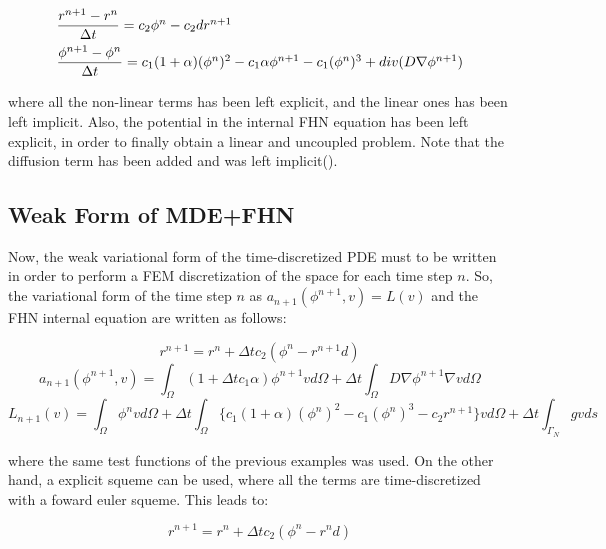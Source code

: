 \begin{equation}
\arraycolsep=1.4pt\def\arraystretch{2.2}
\begin{array}{llr}
\dfrac{r^{n+1} - r^n}{\Delta t} = c_2 \phi^n - c_2 d r^{n+1} \\
\dfrac{\phi^{n+1} - \phi^n}{\Delta t} = c_1 (1 + \alpha) (\phi^n)^2 - c_1 \alpha \phi^{n+1} - c_1 (\phi^n)^3 + div(D \nabla \phi^{n+1})
\end{array}
\end{equation}

\noindent where all the non-linear terms has been left explicit, and the linear ones has been left implicit. Also, the potential in the internal FHN equation has been left explicit, in order to finally obtain a linear and uncoupled problem. Note that the diffusion term has been added and was left implicit().

\subsection{Weak Form of MDE+FHN}

 Now, the weak variational form of the time-discretized PDE must to be written in order to perform a FEM discretization of the space for each time step $n$. So, the variational form of the time step $n$ as $a_{n + 1} (\phi^{n + 1}, v) = L(v)$ and the FHN internal equation are written as follows:

\begin{equation*}
r^{n+1} = r^n + \Delta t c_2 (\phi^n - r^{n+1} d)
\end{equation*}
\begin{equation}
a_{n+1} (\phi^{n + 1}, v) = \int_{\Omega} (1 + \Delta t c_1 \alpha) \phi^{n+1} v d \Omega + \Delta t \int_{\Omega} D \nabla \phi^{n+1} \nabla v d \Omega \label{eq:esquema_definitivo}
\end{equation}
\begin{equation*}
L_{n+1}(v) = \int_{\Omega} \phi^n v d \Omega + \Delta t \int_\Omega \{ c_1(1 + \alpha)(\phi^n)^2 - c_1 (\phi^n)^3 - c_2 r^{n+1} \} v d \Omega + \Delta t \int_{\Gamma_N} g  v ds 
\end{equation*}



\noindent where the same test functions of the previous examples was used. On the other hand, a explicit squeme can be used, where all the terms are time-discretized with a foward euler squeme. This leads to:

\begin{equation*}
r^{n+1} = r^n + \Delta t c_2 (\phi^n - r^n d)
\end{equation*}

